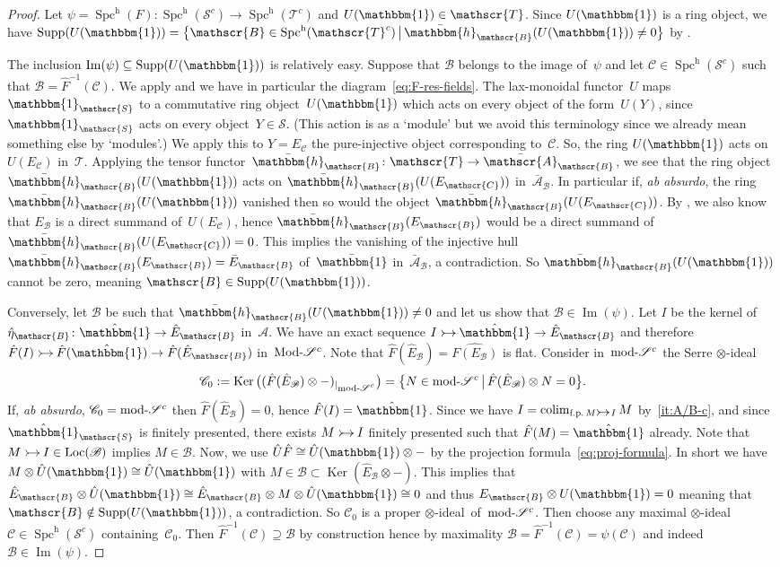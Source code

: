 \documentclass[JEP,XML,SOM,Unicode]{cedram}
\makeatletter
\newcommand{\into}{\mathchoice{\xymatrix@=.5cm{\ar@{>->}[r]&}}
{\xymatrix@=.3cm{\ar@{>->}[r]&}\hspace*{-1mm}}
{\hspace*{-1mm}\xymatrix@=.25cm{\ar@{>->}[r]&}\hspace*{-1.5mm}}
{\xymatrix@=.1cm{\ar@{>->}[r]&}\hspace*{-1mm}}
}
\numberwithin{equation}{section}
\theoremstyle{definition}
\DeclareMathOperator{\colim}{colim}
\DeclareMathOperator{\Ker}{Ker}
\DeclareMathOperator{\Spc}{Spc}
\newcommand{\cat}[1]{\mathscr{#1}}
\newcommand{\inv}{^{-1}}
\newcommand{\SET}[2]{\big\{#1\,\big|\,#2\big\}}
\newcommand{\unit}{\mathbbm{1}}
\DeclareMathOperator{\Img}{Im}
\DeclareMathOperator{\Loc}{Loc}
\DeclareMathOperator{\modname}{mod}
\DeclareMathOperator{\Mod}{Mod}
\newcommand{\smallh}{\mathrm{h}}
\DeclareMathOperator{\Supp}{Supp}
\newcommand{\ababs}{\textit{ab absurdo}}
\newcommand{\AB}{\bar{\cA}_{\cB}}
\newcommand{\bEB}{\bar E_{\cB}}
\newcommand{\boneda}{\bar\yoneda}
\newcommand{\bunit}{\bar\unit}
\newcommand{\cA}{\cat{A}}
\newcommand{\cB}{\cat{B}}
\newcommand{\cC}{\cat{C}}
\newcommand{\cS}{\cat{S}}
\newcommand{\cT}{\cat{T}}
\newcommand{\EB}{E_{\cB}}
\newcommand{\EC}{E_{\cC}}
\newcommand{\hB}{\boneda_{\cB}}
\newcommand{\hEB}{\hat E_{\cB}}
\newcommand{\hunit}{\hat\unit}
\newcommand{\modd}{\modname\text{\!-}}
\newcommand{\Modd}{\Mod\text{\!-}}
\newcommand{\MS}{\Modd\cat S^c}
\newcommand{\mS}{\modd\cat S^c}
\newcommand{\restr}[1]{_{|_{\scriptstyle #1}}}
\newcommand{\SpchS}{\Spch(\cat{S}^c)}
\newcommand{\SpchT}{\Spch(\cat{T}^c)}
\newcommand{\Spch}{\Spc^{\smallh}}
\newcommand{\tensid}{$\otimes$\nobreakdash-ideal}
\newcommand{\yoneda}{\mathbbm{h}}
\makeatother
\begin{document}
\begin{proof}
Let $\psi=\Spch(F)\colon \SpchS\to \SpchT$ and $U(\unit)\in\cT$. Since $U(\unit)$ is a ring object, we have $\Supp(U(\unit))=\SET{\cB\in\SpchT}{\hB(U(\unit))\neq 0}$ by .

The inclusion $\Img(\psi)\subseteq\Supp(U(\unit))$ is relatively easy. Suppose that $\cB$ belongs to the image of~$\psi$ and let $\cC\in\SpchS$ such that $\cB=\hat F\inv(\cC)$. We apply  and we have in particular the diagram~\eqref{eq:F-res-fields}. The lax-monoidal functor~$U$ maps~$\unit_\cS$ to a commutative ring object~$U(\unit)$ which acts on every object of the form~$U(Y)$, since $\unit_\cS$ acts on every object~$Y\in\cS$. (This action is as a `module' but we avoid this terminology since we already mean something else by `modules'.) We apply this to $Y=\EC$ the pure-injective object corresponding to~$\cC$. So, the ring $U(\unit)$ acts on $U(\EC)$ in~$\cT$. Applying the tensor functor~$\hB\colon \cT\to\AB$, we see that the ring object~$\hB(U(\unit))$ acts on $\hB(U(\EC))$ in~$\AB$. In particular if, \ababs, the ring $\hB(U(\unit))$ vanished then so would the object $\hB(U(\EC))$. By , we also know that $\EB$ is a direct summand of~$U(\EC)$, hence $\hB(\EB)$ would be a direct summand of~\hbox{$\hB(U(\EC))=0$}. This implies the vanishing of the injective hull $\hB(\EB)=\bEB$ of~$\bunit$ in~$\AB$, a contradiction. So $\hB(U(\unit))$ cannot be zero, meaning $\cB\in\Supp(U(\unit))$.

Conversely, let $\cB$ be such that $\hB(U(\unit))\neq 0$ and let us show that $\cB\in\Img(\psi)$. Let $I$ be the kernel of $\hat\eta_\cB\colon \hunit\to\hEB$ in~$\cA$. We have an exact sequence $I\into \hunit \to \hEB$ and therefore $\hat F(I)\into \hat F(\hunit)\to \hat F(\hEB)$ in~$\MS$. Note that $\hat F(\hEB)=\widehat{F(\EB)}$ is flat. Consider in~$\mS$ the Serre \tensid
\[
\cC_0:=\Ker\big((\hat F(\hEB)\otimes-)\restr{\mS}\big)=\SET{N\in\mS}{\hat F(\hEB)\otimes N=0}.
\]
If, \ababs, $\cC_0=\mS$ then $\hat F(\hEB)=0$, hence $\hat F(I)=\hunit$. Since we have $I=\colim_{\text{f.p.\,}M\into I}M$ by \,\eqref{it:A/B-c}, and since $\hunit_{\cS}$ is finitely presented, there exists $M\into I$ finitely presented such that $\hat F(M)=\hunit$ already. Note that $M\into I\in\Loc(\cB)$ implies $M\in\cB$. Now, we use $\hat U\hat F\cong \hat U(\unit)\otimes-$ by the projection formula~\eqref{eq:proj-formula}. In short we have $M\otimes \hat U(\unit)\cong \hat U(\unit)$ with $M\in \cB\subset\Ker(\hEB\otimes-)$. This implies that $\hEB\otimes \hat U(\unit)\cong \hEB\otimes M\otimes \hat U(\unit)\cong 0$ and thus $\EB\otimes U(\unit)=0$ meaning that $\cB\notin\Supp(U(\unit))$, a contradiction. So $\cC_0$ is a proper \tensid\ of~$\mS$. Then choose any maximal \tensid\ $\cC\in\SpchS$ containing~$\cC_0$. Then $\hat F\inv(\cC)\supseteq\cB$ by construction hence by maximality $\cB=\hat F\inv(\cC)=\psi(\cC)$ and indeed $\cB\in\Img(\psi)$.
\end{proof}
\end{document}
